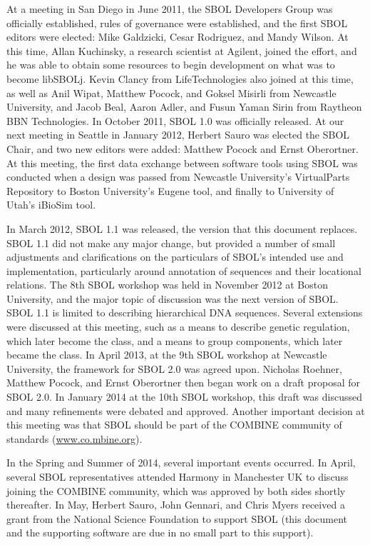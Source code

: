 At a meeting in San Diego in June 2011, the SBOL Developers Group was officially established, rules of governance were established, and the first SBOL editors were elected: Mike Galdzicki, Cesar Rodriguez, and Mandy Wilson.  
At this time, Allan Kuchinsky, a research scientist at Agilent, joined the effort, and he was able to obtain some resources to begin development on what was to become libSBOLj.  
Kevin Clancy from LifeTechnologies also joined at this time, as well as Anil Wipat, Matthew Pocock, and Goksel Misirli from Newcastle University, and Jacob Beal, Aaron Adler, and Fusun Yaman Sirin from Raytheon BBN Technologies.  
In October 2011, SBOL 1.0 was officially released.  At our next meeting in Seattle in January 2012, Herbert Sauro was elected the SBOL Chair, and two new editors were added: Matthew Pocock and Ernst Oberortner.  
At this meeting, the first data exchange between software tools using SBOL was conducted when a design was passed from Newcastle University's VirtualParts Repository to Boston University's Eugene tool, and finally to University of Utah's iBioSim tool. 

In March 2012, SBOL 1.1 was released, the version that this document replaces. 
SBOL 1.1 did not make any major change, but provided a number of small adjustments and clarifications on the particulars of SBOL's intended use and implementation, particularly around annotation of sequences and their locational relations.
The 8th SBOL workshop was held in November 2012 at Boston University, and the major topic of discussion was the next version of SBOL.  SBOL 1.1 is limited to describing hierarchical DNA sequences.  
Several extensions were discussed at this meeting, such as a means to describe genetic regulation, which later become the  class, and a means to group components, which later became the  class.  
In April 2013, at the 9th SBOL workshop at Newcastle University, the framework for SBOL 2.0 was agreed upon.  
Nicholas Roehner, Matthew Pocock, and Ernst Oberortner then began work on a draft proposal for SBOL 2.0.  In January 2014 at the 10th SBOL workshop, this draft was discussed and many refinements were debated and approved.  
Another important decision at this meeting was that SBOL should be part of the COMBINE community of standards (\url{www.co.mbine.org}). 

In the Spring and Summer of 2014, several important events occurred.  In April, several SBOL representatives attended Harmony in Manchester UK to discuss joining the COMBINE community, which was approved by both sides shortly thereafter.  In May, Herbert Sauro, John Gennari, and Chris Myers received a grant from the National Science Foundation to support SBOL (this document and the supporting software are due in no small part to this support).  

